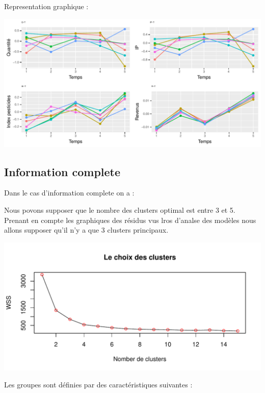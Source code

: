 \documentclass[11pt,]{article}
\begin{document}
\FloatBarrier

Representation graphique :

\includegraphics{note2pres_files/figure-latex/unnamed-chunk-90-1.pdf}

\hypertarget{information-complete}{%
\subsection{Information complete}\label{information-complete}}

Dans le cas d'information complete on a :

\par

Nous povons supposer que le nombre des clusters optimal est entre 3 et
5. Prenant en compte les graphiques des résidus vus lros d'analse des
modèles nous allons supposer qu'il n'y a que 3 clusters principaux.

\FloatBarrier

\includegraphics{note2pres_files/figure-latex/unnamed-chunk-94-1.pdf}

\FloatBarrier

Les groupes sont définies par des caractéristiques suivantes :

\FloatBarrier
\end{document}
